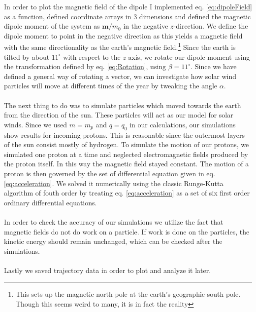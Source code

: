 \noindent In order to plot the magnetic field of the dipole I implemented eq. \ref{eq:dipoleField} as a function, defined coordinate arrays in 3 dimensions and defined the magnetic dipole moment of the system as $\boldsymbol{m}/m_0$ in the negative $z$-direction. We define the dipole moment to point in the negative direction as this yields a magnetic field with the same directionality as the earth's magnetic field.\footnote{This sets up the magnetic north pole at the earth's geographic south pole. Though this seems weird to many, it is in fact the reality} Since the earth is tilted by about $11^{\circ}$ with respect to the $z$-axis, we rotate our dipole moment using the transformation defined by eq. \ref{eq:Rotation}, using $\beta=11^{\circ}$. Since we have defined a general way of rotating a vector, we can investigate how solar wind particles will move at different times of the year by tweaking the angle $\alpha$.\\
\\
The next thing to do was to simulate particles which moved towards the earth from the direction of the sun. These particles will act as our model for solar winds. Since we used $m=m_p$ and $q=q_0$ in our calculations, our simulations show results for incoming protons. This is reasonable since the outermost layers of the sun consist mostly of hydrogen. To simulate the motion of our protons, we simulated one proton at a time and neglected electromagnetic fields produced by the proton itself. In this way the magnetic field stayed constant. The motion of a proton is then governed by the set of differential equation given in eq. \ref{eq:acceleration}. We solved it numerically using the classic Runge-Kutta algorithm of fouth order by treating eq. \ref{eq:acceleration} as a set of six first order ordinary differential equations.\\
\\
In order to check the accuracy of our simulations we utilize the fact that magnetic fields do not do work on a particle. If work is done on the particles, the kinetic energy should remain unchanged, which can be checked after the simulations.\\
\\
Lastly we saved trajectory data in order to plot and analyze it later.\\